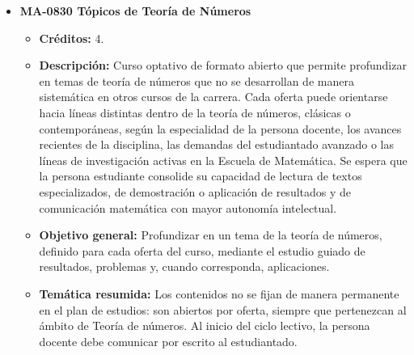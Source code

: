\begin{itemize}[leftmargin=1.3em, itemsep=10pt, topsep=4pt, label={\color{Azul-UCR}$\blacksquare$}]
\item {\color{Azul-UCR}\textbf{MA-0830 Tópicos de Teoría de Números}}\par\nopagebreak\smallskip
\begin{itemize}[leftmargin=1.1em, itemsep=3pt, topsep=2pt, parsep=2pt, label={\textendash}]
\item \textbf{Créditos:} 4.
\item \textbf{Descripción:} Curso optativo de formato abierto que permite profundizar en temas de teoría de números que no se desarrollan de manera sistemática en otros cursos de la carrera. Cada oferta puede orientarse hacia líneas distintas dentro de la teoría de números, clásicas o contemporáneas, según la especialidad de la persona docente, los avances recientes de la disciplina, las demandas del estudiantado avanzado o las líneas de investigación activas en la Escuela de Matemática. Se espera que la persona estudiante consolide su capacidad de lectura de textos especializados, de demostración o aplicación de resultados y de comunicación matemática con mayor autonomía intelectual.
\item \textbf{Objetivo general:} Profundizar en un tema de la teoría de números, definido para cada oferta del curso, mediante el estudio guiado de resultados, problemas y, cuando corresponda, aplicaciones.
\item \textbf{Temática resumida:} Los contenidos no se fijan de manera permanente en el plan de estudios: son abiertos por oferta, siempre que pertenezcan al ámbito de Teoría de números. Al inicio del ciclo lectivo, la persona docente debe comunicar por escrito al estudiantado.
\end{itemize}


\end{itemize}
